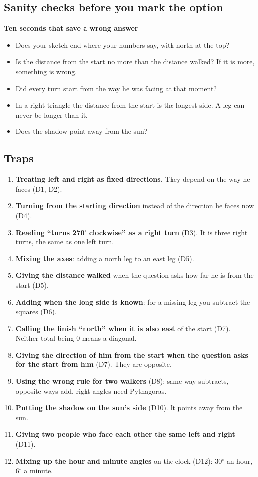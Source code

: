 \documentclass[11pt,a4paper]{article}
\let\oldsubsection\subsection
\renewcommand{\subsection}{\needspace{9\baselineskip}\oldsubsection}
\newcommand{\infobox}[2]{\par\medskip\noindent\begingroup\setlength{\fboxsep}{7pt}%
  \colorbox{codebg}{\parbox{\dimexpr\linewidth-14pt\relax}{\textbf{\color{ember}#1}\par\smallskip #2}}\endgroup\par\medskip}
\begin{document}
\subsection*{Sanity checks before you mark the option}
\infobox{Ten seconds that save a wrong answer}{
\begin{itemize}
\item Does your sketch end where your numbers say, with north at the top?
\item Is the distance from the start no more than the distance walked? If it is more, something is wrong.
\item Did every turn start from the way he was facing at that moment?
\item In a right triangle the distance from the start is the longest side. A leg can never be longer than it.
\item Does the shadow point away from the sun?
\end{itemize}}

\subsection*{Traps}
\begin{enumerate}
\item \textbf{Treating left and right as fixed directions.} They depend on the way he faces (D1, D2).
\item \textbf{Turning from the starting direction} instead of the direction he faces now (D4).
\item \textbf{Reading ``turns 270$^\circ$ clockwise'' as a right turn} (D3). It is three right turns, the same as one left turn.
\item \textbf{Mixing the axes}: adding a north leg to an east leg (D5).
\item \textbf{Giving the distance walked} when the question asks how far he is from the start (D5).
\item \textbf{Adding when the long side is known}: for a missing leg you subtract the squares (D6).
\item \textbf{Calling the finish ``north'' when it is also east} of the start (D7). Neither total being 0 means a diagonal.
\item \textbf{Giving the direction of him from the start when the question asks for the start from him} (D7). They are opposite.
\item \textbf{Using the wrong rule for two walkers} (D8): same way subtracts, opposite ways add, right angles need Pythagoras.
\item \textbf{Putting the shadow on the sun's side} (D10). It points away from the sun.
\item \textbf{Giving two people who face each other the same left and right} (D11).
\item \textbf{Mixing up the hour and minute angles} on the clock (D12): 30$^\circ$ an hour, 6$^\circ$ a minute.
\end{enumerate}
\end{document}
